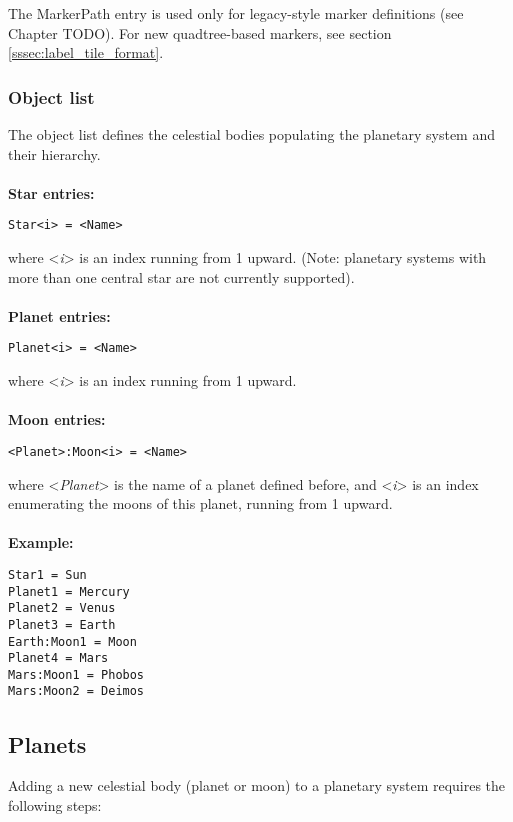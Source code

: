 \documentclass[Orbiter Developer Manual.tex]{subfiles}
\begin{document}
\noindent
The MarkerPath entry is used only for legacy-style marker definitions (see Chapter TODO). For new quadtree-based markers, see section \ref{sssec:label_tile_format}.

\subsubsection*{Object list}
The object list defines the celestial bodies populating the planetary system and their hierarchy.\\
\\
\textbf{Star entries:}

\begin{lstlisting}[language=OSFS]
Star<i> = <Name>
\end{lstlisting}

\noindent
where <\textit{i}> is an index running from 1 upward. (Note: planetary systems with more than one central star are not currently supported).\\
\\
\textbf{Planet entries:}

\begin{lstlisting}[language=OSFS]
Planet<i> = <Name>
\end{lstlisting}

\noindent
where <\textit{i}> is an index running from 1 upward.\\
\\
\textbf{Moon entries:}

\begin{lstlisting}[language=OSFS]
<Planet>:Moon<i> = <Name>
\end{lstlisting}

\noindent
where <\textit{Planet}> is the name of a planet defined before, and <\textit{i}> is an index enumerating the moons of this planet, running from 1 upward.\\
\\
\textbf{Example:}

\begin{lstlisting}[language=OSFS]
Star1 = Sun
Planet1 = Mercury
Planet2 = Venus
Planet3 = Earth
Earth:Moon1 = Moon
Planet4 = Mars
Mars:Moon1 = Phobos
Mars:Moon2 = Deimos
\end{lstlisting}


\subsection{Planets}
\label{ssec:planets}
Adding a new celestial body (planet or moon) to a planetary system requires the following steps:
\end{document}
